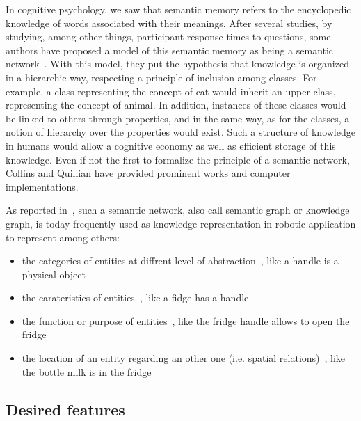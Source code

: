 In cognitive psychology, we saw that semantic memory refers to the encyclopedic knowledge of words associated with their meanings. After several studies, by studying, among other things, participant response times to questions, some authors have proposed a model of this semantic memory as being a semantic network~\cite{collins_1969_retrieval, collins_1970_does}. With this model, they put the hypothesis that knowledge is organized in a hierarchic way, respecting a principle of inclusion among classes. For example, a class representing the concept of cat would inherit an upper class, representing the concept of animal. In addition, instances of these classes would be linked to others through properties, and in the same way, as for the classes, a notion of hierarchy over the properties would exist. Such a structure of knowledge in humans would allow a cognitive economy as well as efficient storage of this knowledge. Even if not the first to formalize the principle of a semantic network, Collins and Quillian have provided prominent works and computer implementations.


As reported in~\cite{prasad_2020_knowledge}, such a semantic network, also call semantic graph or knowledge graph, is today frequently used as knowledge representation in robotic application to represent among others:

\begin{itemize}
  \item the categories of entities at diffrent level of abstraction~\cite{balint_2018_variations}, like a handle is a physical object
  \item the carateristics of entities~\cite{tenorth_2017_representations}, like a fidge has a handle
  \item the function or purpose of entities~\cite{paulius_2019_functional}, like the fridge handle allows to open the fridge
  \item the location of an entity regarding an other one (i.e. spatial relations)~\cite{singh_2020_fuzzy}, like the bottle milk is in the fridge
\end{itemize}


\subsection{Desired features}


